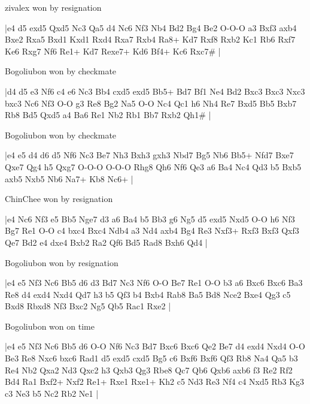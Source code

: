zivalex won by resignation

\makegametitle
|e4 d5 exd5 Qxd5 Nc3 Qa5 d4 Nc6 Nf3 Nb4 Bd2 Bg4 Be2 O-O-O a3 Bxf3 axb4 Bxe2 Rxa5 Bxd1 Kxd1 Rxd4 Rxa7 Rxb4 Ra8+ Kd7 Rxf8 Rxb2 Kc1 Rb6 Rxf7 Ke6 Rxg7 Nf6 Re1+ Kd7 Rexe7+ Kd6 Bf4+ Kc6 Rxc7\#  |

\showboard

Bogoliubon won by checkmate

\makegametitle
|d4 d5 e3 Nf6 c4 e6 Nc3 Bb4 cxd5 exd5 Bb5+ Bd7 Bf1 Ne4 Bd2 Bxc3 Bxc3 Nxc3 bxc3 Nc6 Nf3 O-O g3 Re8 Bg2 Na5 O-O Nc4 Qc1 h6 Nh4 Re7 Bxd5 Bb5 Bxb7 Rb8 Bd5 Qxd5 a4 Ba6 Re1 Nb2 Rb1 Bb7 Rxb2 Qh1\#  |

\showboard

Bogoliubon won by checkmate

\makegametitle
|e4 e5 d4 d6 d5 Nf6 Nc3 Be7 Nh3 Bxh3 gxh3 Nbd7 Bg5 Nb6 Bb5+ Nfd7 Bxe7 Qxe7 Qg4 h5 Qxg7 O-O-O O-O-O Rhg8 Qh6 Nf6 Qe3 a6 Ba4 Nc4 Qd3 b5 Bxb5 axb5 Nxb5 Nb6 Na7+ Kb8 Nc6+  |

\showboard

ChinChee won by resignation

\makegametitle
|e4 Nc6 Nf3 e5 Bb5 Nge7 d3 a6 Ba4 b5 Bb3 g6 Ng5 d5 exd5 Nxd5 O-O h6 Nf3 Bg7 Re1 O-O c4 bxc4 Bxc4 Ndb4 a3 Nd4 axb4 Bg4 Re3 Nxf3+ Rxf3 Bxf3 Qxf3 Qe7 Bd2 e4 dxe4 Bxb2 Ra2 Qf6 Bd5 Rad8 Bxh6 Qd4  |

\showboard

Bogoliubon won by resignation

\makegametitle
|e4 e5 Nf3 Nc6 Bb5 d6 d3 Bd7 Nc3 Nf6 O-O Be7 Re1 O-O b3 a6 Bxc6 Bxc6 Ba3 Re8 d4 exd4 Nxd4 Qd7 h3 b5 Qf3 b4 Bxb4 Rab8 Ba5 Bd8 Nce2 Bxe4 Qg3 c5 Bxd8 Rbxd8 Nf3 Bxc2 Ng5 Qb5 Rac1 Rxe2  |

\showboard

Bogoliubon won on time

\makegametitle
|e4 e5 Nf3 Nc6 Bb5 d6 O-O Nf6 Nc3 Bd7 Bxc6 Bxc6 Qe2 Be7 d4 exd4 Nxd4 O-O Be3 Re8 Nxc6 bxc6 Rad1 d5 exd5 cxd5 Bg5 c6 Bxf6 Bxf6 Qf3 Rb8 Na4 Qa5 b3 Re4 Nb2 Qxa2 Nd3 Qxc2 h3 Qxb3 Qg3 Rbe8 Qc7 Qb6 Qxb6 axb6 f3 Re2 Rf2 Bd4 Ra1 Bxf2+ Nxf2 Re1+ Rxe1 Rxe1+ Kh2 c5 Nd3 Re3 Nf4 c4 Nxd5 Rb3 Kg3 c3 Ne3 b5 Nc2 Rb2 Ne1  |

